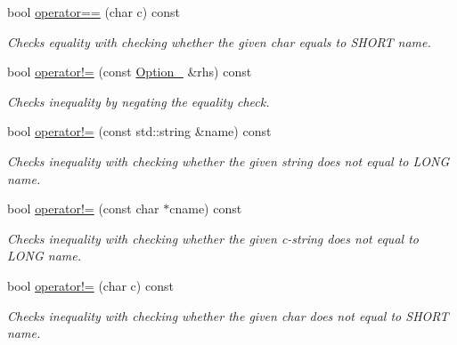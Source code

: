 \begin{DoxyCompactItemize}
    bool \mbox{\hyperlink{class_info_parse_1_1_option___3_01bool_01_4_aca9395fc19886c2cb010c352d3d66fca}{operator==}} (char c) const
    \begin{DoxyCompactList}
        \small\item\em Checks equality with checking whether the given char equals to S\+H\+O\+RT name.
    \end{DoxyCompactList}\item
    bool \mbox{\hyperlink{class_info_parse_1_1_option___3_01bool_01_4_ab97cc00e9a115cad44ce6adf83d93201}{operator!=}} (const \mbox{\hyperlink{class_info_parse_1_1_option__}{Option\+\_\+}} \&rhs) const
    \begin{DoxyCompactList}
        \small\item\em Checks inequality by negating the equality check.
    \end{DoxyCompactList}\item
    \mbox{\label{class_info_parse_1_1_option___3_01bool_01_4_a2df64b893e3a7d1d0f9573725fcf509b}}
    bool \mbox{\hyperlink{class_info_parse_1_1_option___3_01bool_01_4_a2df64b893e3a7d1d0f9573725fcf509b}{operator!=}} (const std\+::string \&name) const
    \begin{DoxyCompactList}
        \small\item\em Checks inequality with checking whether the given string does not equal to L\+O\+NG name.
    \end{DoxyCompactList}\item
    \mbox{\label{class_info_parse_1_1_option___3_01bool_01_4_ac5defea6af4cd3ac40ae7828c6408d2b}}
    bool \mbox{\hyperlink{class_info_parse_1_1_option___3_01bool_01_4_ac5defea6af4cd3ac40ae7828c6408d2b}{operator!=}} (const char $\ast$cname) const
    \begin{DoxyCompactList}
        \small\item\em Checks inequality with checking whether the given c-\/string does not equal to L\+O\+NG name.
    \end{DoxyCompactList}\item
    \mbox{\label{class_info_parse_1_1_option___3_01bool_01_4_a86b967ff18d85126414fb05713a886a4}}
    bool \mbox{\hyperlink{class_info_parse_1_1_option___3_01bool_01_4_a86b967ff18d85126414fb05713a886a4}{operator!=}} (char c) const
    \begin{DoxyCompactList}
        \small\item\em Checks inequality with checking whether the given char does not equal to S\+H\+O\+RT name.
    \end{DoxyCompactList}
\end{DoxyCompactItemize}
